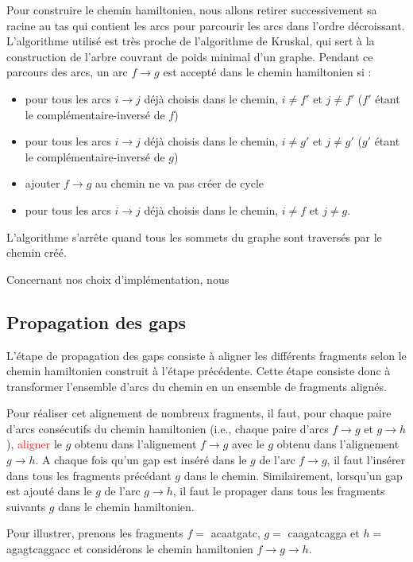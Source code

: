 \documentclass{article}
\begin{document}
Pour construire le chemin hamiltonien, nous allons retirer successivement sa racine au tas qui contient les arcs pour parcourir les arcs dans l'ordre décroissant. L'algorithme utilisé est très proche de l'algorithme de Kruskal, qui sert à la construction de l'arbre couvrant de poids minimal d'un graphe.
Pendant ce parcours des arcs, un arc $f \to g$ est accepté dans le chemin hamiltonien si :

\begin{itemize}
\item pour tous les arcs $i \to j$ déjà choisis dans le chemin, $i \neq f'$ et $j \neq f'$  ($f'$ étant le complémentaire-inversé de $f$)
\item pour tous les arcs $i \to j$ déjà choisis dans le chemin, $i \neq g'$ et $j \neq g'$  ($g'$ étant le complémentaire-inversé de $g$)
\item ajouter $f \to g$ au chemin ne va pas créer de cycle
\item pour tous les arcs $i \to j$ déjà choisis dans le chemin, $i \neq f$ et $j \neq g$.
\end{itemize}

L'algorithme s'arrête quand tous les sommets du graphe sont traversés par le chemin créé.

Concernant nos choix d'implémentation, nous 

\subsection{Propagation des gaps}

L'étape de propagation des gaps consiste à aligner les différents fragments selon le chemin hamiltonien construit à l'étape précédente. Cette étape consiste donc à transformer l'ensemble d'arcs du chemin en un ensemble de fragments alignés. 

Pour réaliser cet alignement de nombreux fragments, il faut, pour chaque paire d'arcs consécutifs du chemin hamiltonien (i.e., chaque paire d'arcs $f \to g$ et $g \to h$), \textcolor{red}{aligner} le $g$ obtenu dans l'alignement $f \to g$ avec le $g$ obtenu dans l'alignement $g \to h$. A chaque fois qu'un gap est inséré dans le $g$ de l'arc $f \to g$, il faut l'insérer dans tous les fragments précédant $g$ dans le chemin. Similairement, lorsqu'un gap est ajouté dans le $g$ de l'arc $g \to h$, il faut le propager dans tous les fragments suivants $g$ dans le chemin hamiltonien. 

Pour illustrer, prenons les fragments $f =$ acaatgatc, $g =$ caagatcagga et $h =$ agagtcaggacc et considérons le chemin hamiltonien $f \to g \to h$.
\end{document}
